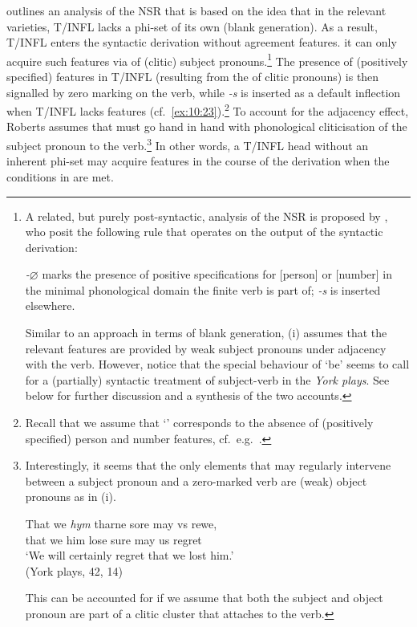 \documentclass[output=paper]{langsci/langscibook}
\begin{document}
\textcite{Roberts:2010} outlines an analysis of the \gls{NSR} that is based on
the idea that in the relevant varieties, T/INFL lacks a phi-set of its own
(blank generation). As a result, T/INFL enters the syntactic derivation without
agreement features. it can only acquire such features via  of
(clitic) subject pronouns.\footnote{A related, but purely
    post-syntactic, analysis of the \gls{NSR} is
    proposed by \citealp{TripsFuss:2010}, who posit the following
     rule that operates on the output of the syntactic
    derivation:

    \begin{exe}
         \emph{-$\varnothing$} marks the presence of positive specifications for [person] or [number] in the minimal phonological domain the finite verb is part of; \emph{-s} is inserted elsewhere.
    \end{exe}
    Similar to an approach in terms of blank generation, (i) assumes that the
    relevant  features are provided by weak subject pronouns
    under adjacency with the verb. However, notice that the special behaviour
    of `be' seems to call for a (partially) syntactic treatment of subject-verb
     in the \emph{York plays}. See below for further discussion
    and a synthesis of the two accounts.} The presence of (positively
    specified)  features in T/INFL (resulting from the
     of clitic pronouns) is then signalled by zero marking
    on the verb, while \emph{-s} is inserted as a default inflection when
    T/INFL lacks  features (cf.\ \ref{ex:10:23}).\footnote{Recall that we
        assume that `\Tsg{}' corresponds to the absence of (positively
        specified) person and number features, cf.\ e.g.\
        \cite{Harleyritter:2002}.\label{fn:10.38}} To account for the adjacency effect, Roberts assumes that  must go hand in hand with phonological cliticisation of the subject pronoun to the verb.\footnote{Interestingly, it seems that the only elements that may regularly intervene between a subject pronoun and a zero-marked verb are (weak) object pronouns as in (i).

    \begin{exe}
        \gll That we \textit{hym} tharne sore may vs rewe,\\
        that we him lose sure may us regret\\
        \glt `We will certainly regret that we lost him.'\\
        (York plays, 42, 14)
    \end{exe}
This can be accounted for if we assume that both the subject and object pronoun
are part of a clitic cluster that attaches to the verb.} In other words, a
T/INFL head without an inherent phi-set may acquire \isi{agreement} features in
the course of the derivation when the conditions in \REF{ex:10:26} are met.
\end{document}
